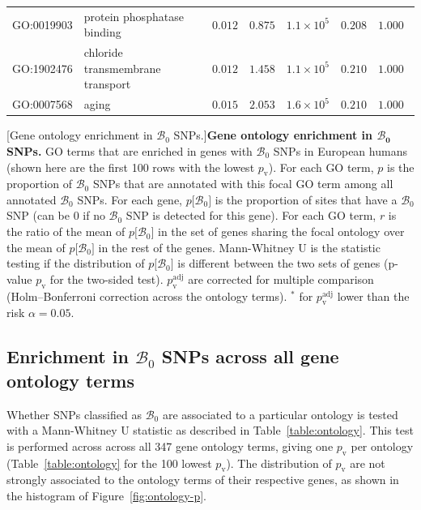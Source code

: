 \documentclass{article}
\newcommand{\SphyBen}{\mathcal{B}_0}
\begin{document}
\begin{center}
\begin{longtable*}{|l|l|r|r|r|r|r|}
            GO:0019903 & protein phosphatase binding & $ 0.012$ & $ 0.875$ & $1.1\times 10^{5}$ & $ 0.208$ & $ 1.000~~$ \\
            GO:1902476 & chloride transmembrane transport & $ 0.012$ & $ 1.458$ & $1.1\times 10^{5}$ & $ 0.210$ & $ 1.000~~$ \\
            GO:0007568 & aging & $ 0.015$ & $ 2.053$ & $1.6\times 10^{5}$ & $ 0.210$ & $ 1.000~~$ \\
        \end{longtable*}
        [Gene ontology enrichment in $\SphyBen$ SNPs.]{\textbf{Gene ontology enrichment in $\bm{\SphyBen}$ SNPs.} GO terms that are enriched in genes with $\SphyBen$ SNPs in European humans (shown here are the first 100 rows with the lowest $p_{\mathrm{v}}$).
        For each GO term, $p$ is the proportion of $\SphyBen$ SNPs that are annotated with this focal GO term among all annotated $\SphyBen$ SNPs.
        For each gene, $p[ \SphyBen {]}$ is the proportion of sites that have a $\SphyBen$ SNP (can be 0 if no $\SphyBen$ SNP is detected for this gene).
        For each GO term, $r$ is the ratio of the mean of $p[ \SphyBen {]}$ in the set of genes sharing the focal ontology over the mean of $p[ \SphyBen {]}$ in the rest of the genes.
        Mann-Whitney U is the statistic testing if the distribution of $p[ \SphyBen {]}$ is different between the two sets of genes (p-value $p_{\mathrm{v}}$ for the two-sided test).
        $p_{\mathrm{v}}^{\mathrm{adj}}$ are corrected for multiple comparison (Holm–Bonferroni correction across the ontology terms).
        $^*$ for $p_{\mathrm{v}}^{\mathrm{adj}}$ lower than the risk $\alpha=0.05$.\label{table:ontology}
        }
    \end{center}

    \newpage
    \subsection{Enrichment in \texorpdfstring{$\SphyBen$}{B₀} SNPs across all gene ontology terms}
    Whether SNPs classified as $\SphyBen$ are associated to a particular ontology is tested with a Mann-Whitney U statistic as described in Table~\ref{table:ontology}.
    This test is performed across across all 347 gene ontology terms, giving one $p_{\mathrm{v}}$ per ontology (Table~\ref{table:ontology} for the 100 lowest $p_{\mathrm{v}}$).
    The distribution of $p_{\mathrm{v}}$ are not strongly associated to the ontology terms of their respective genes, as shown in the histogram of Figure~\ref{fig:ontology-p}.
\end{document}
